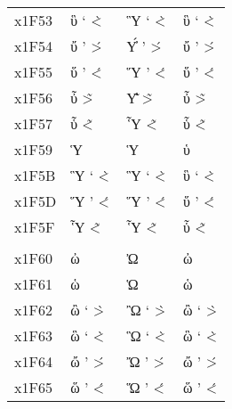 \documentclass[a4paper]{article}
\newcommand*{\Greek}{\foreignlanguage{greek}}
\newcommand*{\Greek}{\ensuregreek}
\newcommand*{\Cases}[1]{%
  & \Greek{#1} & \Greek{\MakeUppercase{#1}} & \Greek{\MakeLowercase{#1}}
}
\begin{document}
\begin{longtable}{llll}
  x1F53 \Cases{ ὓ  \accdasiavaria{\upsilon}                     \<`{\upsilon}               \`<{\upsilon}              } \\
  x1F54 \Cases{ ὔ  \accpsilioxia{\upsilon}                      \>'{\upsilon}               \'>{\upsilon}              } \\
  x1F55 \Cases{ ὕ  \accdasiaoxia{\upsilon}                      \<'{\upsilon}               \'<{\upsilon}              } \\
  x1F56 \Cases{ ὖ  \accpsiliperispomeni{\upsilon}               \~>{\upsilon}               \>~{\upsilon}              } \\
  x1F57 \Cases{ ὗ  \accdasiaperispomeni{\upsilon}               \~<{\upsilon}               \<~{\upsilon}              } \\
  x1F59 \Cases{ Ὑ  \accdasia{\Upsilon}                          \<{\Upsilon}                                           } \\
  x1F5B \Cases{ Ὓ  \accdasiavaria{\Upsilon}                     \<`{\Upsilon}               \`<{\Upsilon}              } \\
  x1F5D \Cases{ Ὕ  \accdasiaoxia{\Upsilon}                      \<'{\Upsilon}               \'<{\Upsilon}              } \\
  x1F5F \Cases{ Ὗ  \accdasiaperispomeni{\Upsilon}               \~<{\Upsilon}               \<~{\Upsilon}              } \\
                                                                                                                         \\
  x1F60 \Cases{ ὠ  \accpsili{\omega}                            \>{\omega}                                             } \\
  x1F61 \Cases{ ὡ  \accdasia{\omega}                            \<{\omega}                                             } \\
  x1F62 \Cases{ ὢ  \accpsilivaria{\omega}                       \>`{\omega}                 \`>{\omega}                } \\
  x1F63 \Cases{ ὣ  \accdasiavaria{\omega}                       \<`{\omega}                 \`<{\omega}                } \\
  x1F64 \Cases{ ὤ  \accpsilioxia{\omega}                        \>'{\omega}                 \'>{\omega}                } \\
  x1F65 \Cases{ ὥ  \accdasiaoxia{\omega}                        \<'{\omega}                 \'<{\omega}                } \\

\end{longtable}
\end{document}
